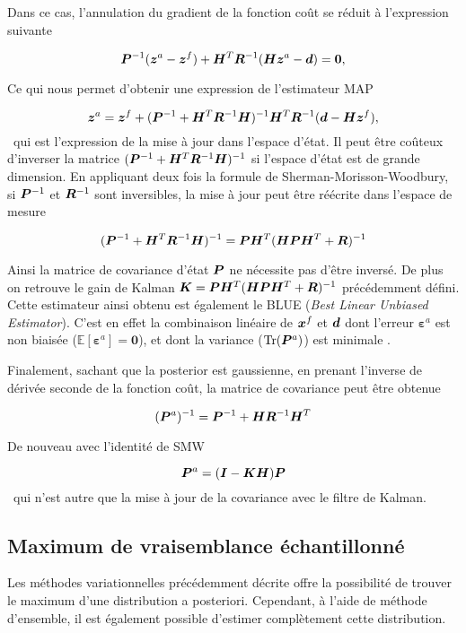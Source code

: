 Dans ce cas, l'annulation du gradient de la fonction coût se réduit à l'expression suivante

\begin{equation*}
    \bm{P}^{-1} (\bm z^a - \bm z^f) + \bm{H}^T \bm{R}^{-1}(\bm{H} \bm z^a - \bm d) = \bm 0,
\end{equation*}

Ce qui nous permet d'obtenir une expression de l'estimateur MAP

\begin{equation*}
    \bm z^a = \bm z^f + (\bm{P}^{-1} + \bm{H}^T \bm{R}^{-1} \bm{H})^{-1} \bm{H}^T \bm{R}^{-1} (\bm{d} - \bm{H} \bm z^f),
\end{equation*}~qui est l'expression de la mise à jour dans l'espace d'état. Il peut être coûteux d'inverser la matrice $(\bm{P}^{-1} + \bm{H}^T \bm{R}^{-1} \bm{H})^{-1}$ si l'espace d'état est de grande dimension. En appliquant deux fois la formule de Sherman-Morisson-Woodbury, si $\bm{P}^{-1}$ et $\bm{R}^{-1}$ sont inversibles, la mise à jour peut être réécrite dans l'espace de mesure

\begin{equation*}
    (\bm{P}^{-1} + \bm{H}^T \bm{R}^{-1} \bm{H})^{-1} = \bm{P} \bm{H}^T (\bm{H} \bm{P} \bm{H}^T + \bm{R})^{-1}
\end{equation*}

Ainsi la matrice de covariance d'état $\bm{P}$ ne nécessite pas d'être inversé. De plus on retrouve le gain de Kalman $\bm{K} = \bm{P} \bm{H}^T (\bm{H} \bm{P} \bm{H}^T + \bm{R})^{-1}$ précédemment défini. Cette estimateur ainsi obtenu est également le BLUE (\textit{Best Linear Unbiased Estimator}). C'est en effet la combinaison linéaire de $\bm{x}^f$ et $\bm{d}$ dont l'erreur $\bm \varepsilon^a$ est non biaisée ($\mathbb{E}[\bm \varepsilon^a] = \bm 0$), et dont la variance ($\operatorname{Tr}(\bm{P}^a)$) est minimale .

Finalement, sachant que la posterior est gaussienne, en prenant l'inverse de dérivée seconde de la fonction coût, la matrice de covariance peut être obtenue

\begin{equation*}
    (\bm{P}^a)^{-1} = \bm{P}^{-1} + \bm{H} \bm{R}^{-1} \bm{H}^T
\end{equation*}

De nouveau avec l'identité de SMW

\begin{equation*}
    \bm{P}^a = (\bm{I} - \bm{K} \bm{H}) \bm{P}
\end{equation*}~qui n'est autre que la mise à jour de la covariance avec le filtre de Kalman.

\subsection{Maximum de vraisemblance échantillonné}
Les méthodes variationnelles précédemment décrite offre la possibilité de trouver le maximum d'une distribution a posteriori. Cependant, à l'aide de méthode d'ensemble, il est également possible d'estimer complètement cette distribution.

